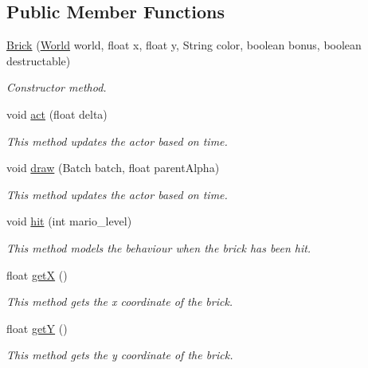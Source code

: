 \subsection*{Public Member Functions}
\begin{DoxyCompactItemize}
\item 
\hyperlink{classnl_1_1arjanfrans_1_1mario_1_1model_1_1Brick_addfb506d6f243693b69d579b2cedb3ec}{Brick} (\hyperlink{classnl_1_1arjanfrans_1_1mario_1_1model_1_1World}{World} world, float x, float y, String color, boolean bonus, boolean destructable)
\begin{DoxyCompactList}\small\item\em Constructor method. \end{DoxyCompactList}\item 
void \hyperlink{classnl_1_1arjanfrans_1_1mario_1_1model_1_1Brick_a04b6eece7156ca21f139a20809220f17}{act} (float delta)
\begin{DoxyCompactList}\small\item\em This method updates the actor based on time. \end{DoxyCompactList}\item 
void \hyperlink{classnl_1_1arjanfrans_1_1mario_1_1model_1_1Brick_a92e1021bfa260049d650dc962874b19a}{draw} (Batch batch, float parent\+Alpha)
\begin{DoxyCompactList}\small\item\em This method updates the actor based on time. \end{DoxyCompactList}\item 
void \hyperlink{classnl_1_1arjanfrans_1_1mario_1_1model_1_1Brick_aeca0f5bee7ddc1377fd85e60e8341590}{hit} (int mario\+\_\+level)
\begin{DoxyCompactList}\small\item\em This method models the behaviour when the brick has been hit. \end{DoxyCompactList}\item 
float \hyperlink{classnl_1_1arjanfrans_1_1mario_1_1model_1_1Brick_a423a5d8853e99442315e102408f3e0ec}{getX} ()
\begin{DoxyCompactList}\small\item\em This method gets the x coordinate of the brick. \end{DoxyCompactList}\item 
float \hyperlink{classnl_1_1arjanfrans_1_1mario_1_1model_1_1Brick_afc049458a63d92b001328afe8714c2f8}{getY} ()
\begin{DoxyCompactList}\small\item\em This method gets the y coordinate of the brick. \end{DoxyCompactList}\item 

\end{DoxyCompactItemize}
